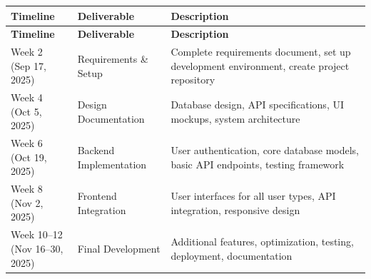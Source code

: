 \documentclass[12pt,a4paper]{article}
\begin{document}
\begin{longtable}{|p{3.25cm}|p{3.75cm}|p{7.5cm}|}
\hline
\textbf{Timeline} & \textbf{Deliverable} & \textbf{Description} \\
\hline
\endfirsthead

\hline
\textbf{Timeline} & \textbf{Deliverable} & \textbf{Description} \\
\hline
\endhead

\hline
\endfoot

\hline
\endlastfoot

\makecell[l]{Week 2\\(Sep 17, 2025)} & Requirements \& Setup & Complete requirements document, set up development environment, create project repository \\
\hline
\makecell[l]{Week 4\\(Oct 5, 2025)} & Design Documentation & Database design, API specifications, UI mockups, system architecture \\
\hline
\makecell[l]{Week 6\\(Oct 19, 2025)} & Backend Implementation & User authentication, core database models, basic API endpoints, testing framework \\
\hline
\makecell[l]{Week 8\\(Nov 2, 2025)} & Frontend Integration & User interfaces for all user types, API integration, responsive design \\
\hline
\makecell[l]{Week 10--12\\(Nov 16--30, 2025)} & Final Development & Additional features, optimization, testing, deployment, documentation \\
\hline
\end{longtable}


\end{document}
